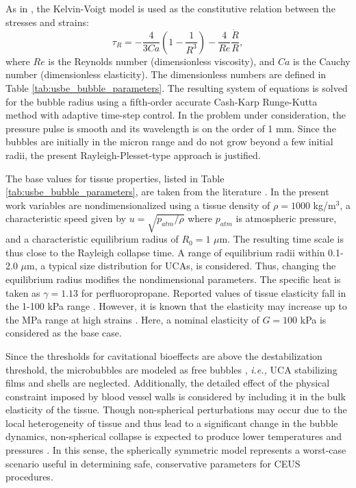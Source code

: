 As in \cite{Yang2005}, the Kelvin-Voigt model is used as the
constitutive relation between the stresses and strains:
\begin{equation}
  \tau_R = -\frac{4}{3
  Ca}\left(1-\frac{1}{R^3}\right) - \frac{4}{Re}\frac{\dot{R}}{R},
\end{equation}
where $Re$ is the Reynolds number (dimensionless viscosity), and $Ca$
is the Cauchy number (dimensionless elasticity).  The dimensionless
numbers are defined in Table
\ref{tab:usbe_bubble_parameters}.  %
The resulting system of equations is solved for the bubble radius
using a fifth-order accurate Cash-Karp Runge-Kutta method with
adaptive time-step control. In the problem under consideration, the
pressure pulse is smooth and its wavelength is on the order of 1
mm. Since the bubbles are initially in the micron range and do not
grow beyond a few initial radii, the present Rayleigh-Plesset-type
approach is justified.


The base values for tissue properties, listed in Table
\ref{tab:usbe_bubble_parameters}, are taken from the literature
\cite[]{apfel1991,Yang2005}. In the present work variables are
nondimensionalized using a tissue density of $\rho=1000$ kg/m$^3$, a
characteristic speed given by $u=\sqrt{p_{atm}/\rho}$ where $p_{atm}$
is atmospheric pressure, and a characteristic equilibrium radius of
$R_0=1$ $\mu$m. The resulting time scale is thus close to the Rayleigh
collapse time.  A range of equilibrium radii within 0.1-2.0 $\mu$m, a
typical size distribution for UCAs, is considered. Thus, changing the
equilibrium radius modifies the nondimensional parameters.  The
specific heat is taken as $\gamma =1.13$ for
perfluoropropane. Reported values of tissue elasticity fall in the
1-100 kPa range \cite[]{arda2011%
}. However, it is known that the elasticity may increase up to the MPa
range at high strains \cite[]{krouskop1998}.  Here, a nominal
elasticity of $G=100$ kPa is considered as the base case.

Since the thresholds for cavitational bioeffects are above the
destabilization threshold, the microbubbles are modeled as free
bubbles \cite[]{sboros2002,marmottant2005}, \textit{i.e.,} UCA
stabilizing films and shells are neglected.  Additionally, the
detailed effect of the physical constraint imposed by blood vessel
walls is considered by including it in the bulk elasticity of the
tissue. Though non-spherical perturbations may occur due to the local
heterogeneity of tissue and thus lead to a significant change in the
bubble dynamics, non-spherical collapse is expected to produce lower
temperatures and pressures \cite[]{johnsen2009}.  In this sense, the
spherically symmetric model represents a worst-case scenario useful in
determining safe, conservative parameters for CEUS procedures.

